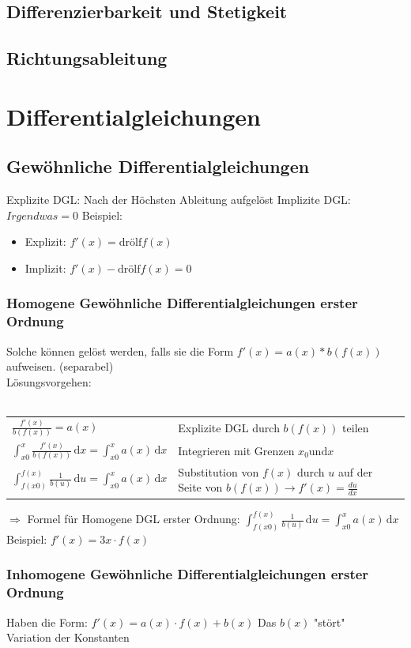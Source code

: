 \documentclass[a4paper,portrait]{scrartcl}
\begin{document}
\subsection{Differenzierbarkeit und Stetigkeit}
\subsection{Richtungsableitung}
\section{Differentialgleichungen}
\subsection{Gewöhnliche Differentialgleichungen}
Explizite DGL: Nach der Höchsten Ableitung aufgelöst
Implizite DGL: $Irgendwas = 0$
Beispiel:
\begin{itemize}
	\item Explizit: $f'(x) = \text{drölf} f(x)$
	\item Implizit: $f'(x) - \text{drölf} f(x) = 0$
\end{itemize}

\subsubsection{Homogene Gewöhnliche Differentialgleichungen erster Ordnung}
Solche können gelöst werden, falls sie die Form $f'(x) = a(x) * b(f(x)) $ aufweisen. (separabel) \\
Lösungsvorgehen: \\ \\
\begin{tabular}{ll}
	$\frac{f'(x)}{b(f(x))} = a(x)$ & Explizite DGL durch $b(f(x))$ teilen\\
	$\int_{x0}^{x}\!\frac{f'(x)}{b(f(x))}\,\mathrm{d}x = \int_{x0}^{x}\!a(x)\,\mathrm{d}x$ & Integrieren mit Grenzen $x_0 \text{und} x$ \\
	$\int_{f(x0)}^{f(x)}\!\frac{1}{b(u)}\,\mathrm{d}u = \int_{x0}^{x}\!a(x)\,\mathrm{d}x$&Substitution von $f(x)$ durch $u$ auf der Seite von $b(f(x)) \rightarrow f'(x) = \frac{du}{dx}$
\end{tabular}
$\Rightarrow$ Formel für Homogene DGL erster Ordnung: $\int_{f(x0)}^{f(x)}\!\frac{1}{b(u)}\,\mathrm{d}u = \int_{x0}^{x}\!a(x)\,\mathrm{d}x$\\
Beispiel: $f'(x) = 3x \cdot f(x)$ \\
\subsubsection{Inhomogene Gewöhnliche Differentialgleichungen erster Ordnung}
Haben die Form: $f'(x) = a(x) \cdot f(x) + b(x)$ Das $b(x)$ "stört" \\


Variation der Konstanten
\end{document}
